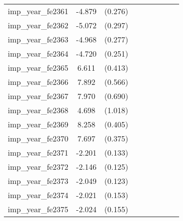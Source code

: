 {\begin{tabular}{l*{4}{cc}}
imp\_year\_fe2361&   -4.879\sym{***}&  (0.276)&                  &         &                  &         &                  &         \\
imp\_year\_fe2362&   -5.072\sym{***}&  (0.297)&                  &         &                  &         &                  &         \\
imp\_year\_fe2363&   -4.968\sym{***}&  (0.277)&                  &         &                  &         &                  &         \\
imp\_year\_fe2364&   -4.720\sym{***}&  (0.251)&                  &         &                  &         &                  &         \\
imp\_year\_fe2365&    6.611\sym{***}&  (0.413)&                  &         &                  &         &                  &         \\
imp\_year\_fe2366&    7.892\sym{***}&  (0.566)&                  &         &                  &         &                  &         \\
imp\_year\_fe2367&    7.970\sym{***}&  (0.690)&                  &         &                  &         &                  &         \\
imp\_year\_fe2368&    4.698\sym{***}&  (1.018)&                  &         &                  &         &                  &         \\
imp\_year\_fe2369&    8.258\sym{***}&  (0.405)&                  &         &                  &         &                  &         \\
imp\_year\_fe2370&    7.697\sym{***}&  (0.375)&                  &         &                  &         &                  &         \\
imp\_year\_fe2371&   -2.201\sym{***}&  (0.133)&                  &         &                  &         &                  &         \\
imp\_year\_fe2372&   -2.146\sym{***}&  (0.125)&                  &         &                  &         &                  &         \\
imp\_year\_fe2373&   -2.049\sym{***}&  (0.123)&                  &         &                  &         &                  &         \\
imp\_year\_fe2374&   -2.021\sym{***}&  (0.153)&                  &         &                  &         &                  &         \\
imp\_year\_fe2375&   -2.024\sym{***}&  (0.155)&                  &         &                  &         &                  &         \\

\end{tabular}}
